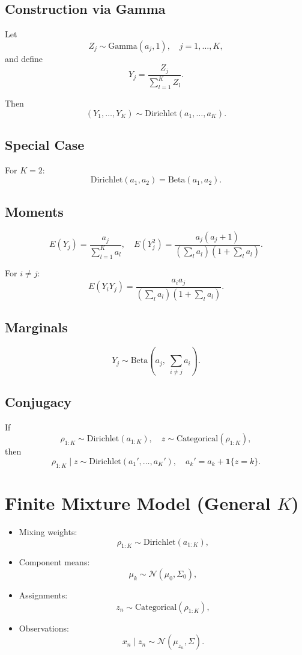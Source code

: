 \documentclass[12pt,oneside]{book}
\numberwithin{equation}{section}
\theoremstyle{definition}
\theoremstyle{plain}
\theoremstyle{remark}
\begin{document}
\subsection*{Construction via Gamma}

Let
\[
Z_j \sim \mathrm{Gamma}(a_j,1), \quad j=1,\dots,K,
\]
and define
\[
Y_j = \frac{Z_j}{\sum_{l=1}^K Z_l}.
\]

Then
\[
(Y_1,\dots,Y_K) \sim \mathrm{Dirichlet}(a_1,\dots,a_K).
\]

\subsection*{Special Case}

For $K=2$:
\[
\mathrm{Dirichlet}(a_1,a_2) = \mathrm{Beta}(a_1,a_2).
\]

\subsection*{Moments}

\[
E(Y_j) = \frac{a_j}{\sum_{l=1}^K a_l},
\quad
E(Y_j^2) = \frac{a_j(a_j+1)}{(\sum_l a_l)(1+\sum_l a_l)}.
\]

For $i \neq j$:
\[
E(Y_i Y_j) = \frac{a_i a_j}{(\sum_l a_l)(1+\sum_l a_l)}.
\]

\subsection*{Marginals}

\[
Y_j \sim \mathrm{Beta}\left(a_j,\; \sum_{i \neq j} a_i\right).
\]

\subsection*{Conjugacy}

If
\[
\rho_{1:K} \sim \mathrm{Dirichlet}(a_{1:K}), \quad z \sim \mathrm{Categorical}(\rho_{1:K}),
\]
then
\[
\rho_{1:K} \mid z \sim \mathrm{Dirichlet}(a_1',\dots,a_K'),
\quad
a_k' = a_k + \mathbf{1}\{z = k\}.
\]

\section{Finite Mixture Model (General $K$)}

\begin{itemize}
\item Mixing weights:
\[
\rho_{1:K} \sim \mathrm{Dirichlet}(a_{1:K}),
\]

\item Component means:
\[
\mu_k \sim \mathcal{N}(\mu_0,\Sigma_0),
\]

\item Assignments:
\[
z_n \sim \mathrm{Categorical}(\rho_{1:K}),
\]

\item Observations:
\[
x_n \mid z_n \sim \mathcal{N}(\mu_{z_n}, \Sigma).
\]
\end{itemize}
\end{document}
